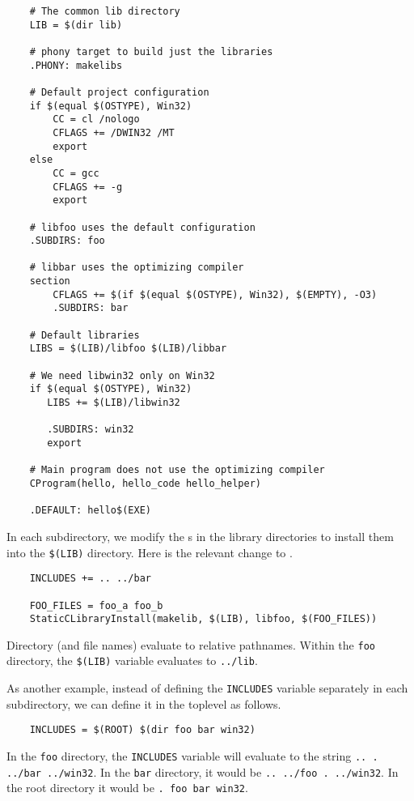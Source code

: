 \begin{verbatim}
    # The common lib directory
    LIB = $(dir lib)

    # phony target to build just the libraries
    .PHONY: makelibs

    # Default project configuration
    if $(equal $(OSTYPE), Win32)
        CC = cl /nologo
        CFLAGS += /DWIN32 /MT
        export
    else
        CC = gcc
        CFLAGS += -g
        export

    # libfoo uses the default configuration
    .SUBDIRS: foo

    # libbar uses the optimizing compiler
    section
        CFLAGS += $(if $(equal $(OSTYPE), Win32), $(EMPTY), -O3)
        .SUBDIRS: bar

    # Default libraries
    LIBS = $(LIB)/libfoo $(LIB)/libbar

    # We need libwin32 only on Win32
    if $(equal $(OSTYPE), Win32)
       LIBS += $(LIB)/libwin32

       .SUBDIRS: win32
       export

    # Main program does not use the optimizing compiler
    CProgram(hello, hello_code hello_helper)

    .DEFAULT: hello$(EXE)
\end{verbatim}

In each subdirectory, we modify the s in the library directories to install them
into the \verb+$(LIB)+ directory.  Here is the relevant change to .

\begin{verbatim}
    INCLUDES += .. ../bar

    FOO_FILES = foo_a foo_b
    StaticCLibraryInstall(makelib, $(LIB), libfoo, $(FOO_FILES))
\end{verbatim}

Directory (and file names) evaluate to relative pathnames.  Within the \verb+foo+ directory, the
\verb+$(LIB)+ variable evaluates to \verb+../lib+.

As another example, instead of defining the \verb+INCLUDES+ variable separately
in each subdirectory, we can define it in the toplevel as follows.

\begin{verbatim}
    INCLUDES = $(ROOT) $(dir foo bar win32)
\end{verbatim}

In the \verb+foo+ directory, the \verb+INCLUDES+ variable will evaluate to
the string \verb+.. . ../bar ../win32+.  In the \verb+bar+ directory,
it would be \verb+.. ../foo . ../win32+.  In the root directory it
would be \verb+. foo bar win32+.

